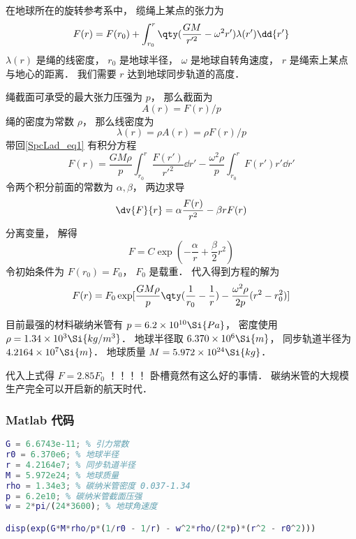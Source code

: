 
\begin{issues}
\issueDraft
\end{issues}

在地球所在的旋转参考系中， 缆绳上某点的张力为
\begin{equation}\label{SpcLad_eq1}
F(r) = F(r_0) + \int_{r_0}^{r} \qty(\frac{GM}{r'^2} - \omega^2 r') \lambda(r') \dd{r'}
\end{equation}
$\lambda(r)$ 是绳的线密度， $r_0$ 是地球半径， $\omega$ 是地球自转角速度， $r$ 是绳索上某点与地心的距离． 我们需要 $r$ 达到地球同步轨道的高度．

绳截面可承受的最大张力压强为 $p$， 那么截面为
\begin{equation}
A(r) = F(r)/p
\end{equation}
绳的密度为常数 $\rho$， 那么线密度为
\begin{equation}
\lambda(r) = \rho A(r) = \rho F(r)/p
\end{equation}
带回\autoref{SpcLad_eq1} 有积分方程
\begin{equation}
F(r) = \frac{GM\rho}{p} \int_{r_0}^{r} \frac{F(r')}{r'^2} \dd{r'} - \frac{\omega^2\rho}{p}\int_{r_0}^r F(r') r' \dd{r'}
\end{equation}
令两个积分前面的常数为 $\alpha, \beta$， 两边求导
\begin{equation}
\dv{F}{r} = \alpha \frac{F(r)}{r^2} - \beta r F(r)
\end{equation}
分离变量， 解得
\begin{equation}
F = C\exp(-\frac{\alpha}{r} + \frac{\beta}{2} r^2)
\end{equation}
令初始条件为 $F(r_0) = F_0$， $F_0$ 是载重． 代入得到方程的解为
\begin{equation}
F(r) = F_0 \exp[\frac{GM\rho}{p} \qty(\frac{1}{r_0} - \frac{1}{r}) - \frac{\omega^2\rho}{2p}(r^2 - r_0^2)]
\end{equation}

目前最强的材料碳纳米管有 $p = 6.2\times 10^{10} \Si{Pa}$， 密度使用 $\rho = 1.34\times 10^{3} \Si{kg/m^3}$． 地球半径取 $6.370\times 10^6\Si{m}$， 同步轨道半径为 $4.2164\times 10^7 \Si{m}$． 地球质量 $M = 5.972 \times 10^{24} \Si{kg}$．

代入上式得 $F = 2.85 F_0$ ！！！！ 卧槽竟然有这么好的事情． 碳纳米管的大规模生产完全可以开启新的航天时代．

\subsubsection{Matlab 代码}
\begin{lstlisting}[language=matlab]
G = 6.6743e-11; % 引力常数
r0 = 6.370e6; % 地球半径
r = 4.2164e7; % 同步轨道半径
M = 5.972e24; % 地球质量
rho = 1.34e3; % 碳纳米管密度 0.037-1.34
p = 6.2e10; % 碳纳米管截面压强
w = 2*pi/(24*3600); % 地球角速度

disp(exp(G*M*rho/p*(1/r0 - 1/r) - w^2*rho/(2*p)*(r^2 - r0^2)))
\end{lstlisting}

